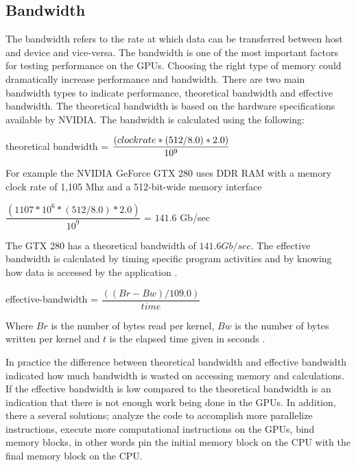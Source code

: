 \subsection{Bandwidth}

The bandwidth refers to the rate at which data can be transferred between host and device and vice-versa. The bandwidth is one of the most important factors for testing performance on the GPUs. Choosing the right type of memory could dramatically increase performance and bandwidth. There are two main bandwidth types to indicate performance, theoretical bandwidth and effective bandwidth. The theoretical bandwidth is based on the hardware specifications available by NVIDIA. The bandwidth is calculated using the following:

\vspace{0.8em}
\begin{center}
 {\listf theoretical bandwidth} = $\dfrac{({\listf clock rate} * (512 / 8.0 ) * 2.0)} { 10^{9}}$
\end{center}
\vspace{0.8em}

For example the NVIDIA GeForce GTX 280 uses DDR RAM with a memory clock rate of 1,105 Mhz and a 512-bit-wide memory interface

\vspace{0.8em}
\begin{center}
$\dfrac{(1107 * 10^6 * (512/8.0) * 2.0 )}{10^9}$ = $141.6$ Gb/sec
\end{center}
\vspace{0.8em}

The GTX 280 has a theoretical bandwidth of $141.6Gb/sec$. The effective bandwidth is calculated by timing specific program activities and by knowing how data is accessed by the application \cite{practices}.

\vspace{0.8em}
\begin{center}
{\listf effective-bandwidth} = $\dfrac{((Br - Bw) / 109.0 )}{time}$
\end{center}
\vspace{0.8em}

Where $Br$ is the number of bytes read per kernel, $Bw$ is the number of bytes written per kernel and  $t$ is the elapsed time given in seconds \cite{fortran}.

In practice the difference between theoretical bandwidth and effective bandwidth indicated how much bandwidth is wasted on accessing memory and calculations. If the effective bandwidth is low compared to the theoretical bandwidth is an indication that there is not enough work being done in the GPUs. In addition, there a several solutions; analyze the code to accomplish more parallelize instructions, execute more computational instructions on the GPUs, bind memory blocks, in other words pin the initial memory block on the CPU with the final memory  block on the CPU.


